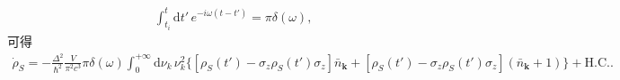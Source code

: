 \documentclass{assignment}
\begin{document}
\begin{sol}
\begin{align}
        \int_{t_i}^t\mathrm{d}t'\,e^{-i\omega(t-t')}=\pi\delta(\omega),
    \end{align}
    可得
    \begin{align}
        \dot{\rho}_S=-\frac{\Delta^2}{\hbar^2}\frac{V}{\pi^2c^3}\pi\delta(\omega)\int_0^{+\infty}\mathrm{d}\nu_k\,\nu_k^2\{[\rho_S(t')-\sigma_z\rho_S(t')\sigma_z]\bar{n}_{\bm{k}}+[\rho_S(t')-\sigma_z\rho_S(t')\sigma_z](\bar{n}_{\bm{k}}+1)\}+\text{H.C.}.
    \end{align}
\end{sol}
\end{document}
